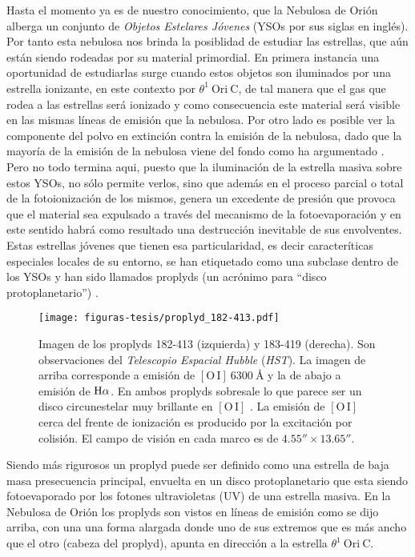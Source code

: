 Hasta el momento ya es de nuestro conocimiento, que la Nebulosa de Orión alberga un conjunto de \textit{Objetos Estelares Jóvenes} (YSOs por sus siglas en inglés). Por tanto esta nebulosa nos brinda la posiblidad de estudiar las estrellas, que aún están siendo rodeadas por su material primordial. En primera instancia una oportunidad de estudiarlas surge cuando estos objetos son iluminados por una estrella ionizante, en este contexto  por \(\theta^1\ \text{Ori}\ \text{C}\), de tal manera que el gas que rodea a las estrellas será ionizado y como consecuencia este material será visible en las mismas líneas de emisión que la nebulosa. Por otro lado es posible ver la componente del polvo en extinción contra la emisión de la nebulosa, dado que la mayoría de la emisión de la nebulosa viene del fondo como ha argumentado \citet{Odell:2008}. Pero no todo termina aqui, puesto que la iluminación de la estrella masiva sobre estos YSOs, no sólo permite verlos, sino que además en el proceso parcial o total de la fotoionización de los mismos, genera un excedente de presión que provoca que el material sea expulsado a través del mecanismo de la fotoevaporación y en este sentido habrá como resultado una destrucción inevitable de sus envolventes. Estas estrellas jóvenes que tienen esa particularidad, es decir caracteríticas especiales locales de su entorno, se han etiquetado como una subclase dentro de los YSOs y han sido llamados proplyds (un acrónimo para ``disco protoplanetario'') \citep{Odell:1994}.\\

\begin{figure}
  \centering
  \texttt{[image: figuras-tesis/proplyd\_182-413.pdf]}
  \caption{Imagen de los proplyds 182-413 (izquierda) y 183-419 (derecha). Son observaciones del \textit{Telescopio Espacial Hubble} (\textit{HST}). La imagen de arriba corresponde a emisión de \(\mathrm{[O\,I]}~6300~\text{\AA{}}\)  y la de abajo a emisión de \(\mathrm{H}\alpha\). En ambos proplyds sobresale lo que parece ser un disco circunestelar muy brillante en  \(\mathrm{[O\,I]}\) \citep{Bally:2000a}. La emisión de \(\mathrm{[O\,I]}\) cerca del frente de ionización es producido por la excitación por colisión. El campo de visión en cada marco es de \(4.55'' \times 13.65''\).}
  \label{fig:182-413}
\end{figure}
  
Siendo más rigurosos un proplyd puede ser definido como una estrella de baja masa presecuencia principal, envuelta en un  disco protoplanetario que esta siendo fotoevaporado por los fotones ultravioletas (UV) de una estrella masiva. En la Nebulosa de Orión los proplyds son vistos en líneas de emisión como se dijo arriba, con una una forma alargada donde uno de sus extremos que es más ancho que el otro (cabeza del proplyd), apunta en dirección a la estrella  \(\theta^1\ \text{Ori}\ \text{C}\). 

